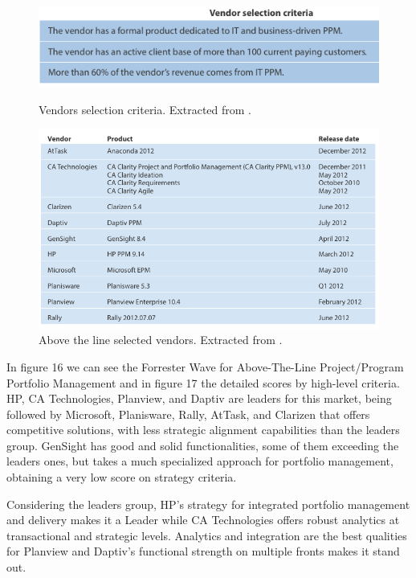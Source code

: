 \begin{figure}[h!]
\begin{minipage}[h!]{0.45\linewidth}
\centering
\includegraphics[width=\textwidth]{img/AboveLineCriteria.png}
\caption{Vendors selection criteria. Extracted from \cite{forresterWavePPM}.}
\label{fig:figure1}
\end{minipage}
\hspace{0.5cm}
\begin{minipage}[h!]{0.55\linewidth}
\centering
\includegraphics[width=\textwidth]{img/AboveLineVendors.png}
\caption{Above the line selected vendors. Extracted from \cite{forresterWavePPM}.}
\label{fig:figure2}
\end{minipage}
\end{figure}

In figure 16 we can see the Forrester Wave for Above-The-Line Project/Program Portfolio Management and in figure 17 the detailed scores by high-level criteria. HP, CA Technologies, Planview, and Daptiv are leaders for this market, being followed by Microsoft, Planisware, Rally, AtTask, and Clarizen that offers competitive solutions, with less strategic alignment capabilities than the leaders group. GenSight has good and solid functionalities, some of them exceeding the leaders ones, but takes a much specialized approach for portfolio management, obtaining a very low score on strategy criteria.\par
Considering the leaders group, HP's strategy for integrated portfolio management and delivery makes it a Leader while CA Technologies offers robust analytics at transactional and strategic levels. Analytics and integration are the best qualities for Planview and Daptiv's functional strength on multiple fronts makes it stand out.\par



